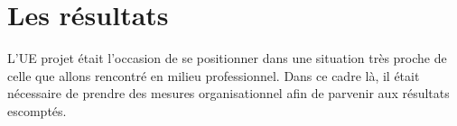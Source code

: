 \chapter{Les résultats}
L'UE projet était l'occasion de se positionner dans une situation très proche de celle que allons rencontré en milieu professionnel. Dans ce cadre là, il était nécessaire de prendre des mesures organisationnel afin de parvenir aux résultats escomptés. 


